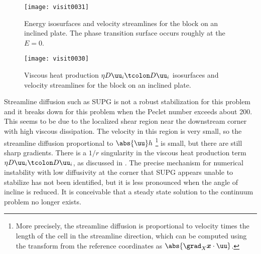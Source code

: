 \begin{figure}
  \centering\texttt{[image: visit0031]}
  \caption{Energy isosurfaces and velocity streamlines for the block on an inclined plate.
  The phase transition surface occurs roughly at the $E=0$.}\label{fig:vhtblock:energy}
\end{figure}

\begin{figure}
  \centering\texttt{[image: visit0030]}
  \caption{Viscous heat production $\eta D\uu_i\tcolon D\uu_i$ isosurfaces and velocity streamlines for the block on an inclined plate.}\label{fig:vhtblock:sigma}
\end{figure}

Streamline diffusion such as SUPG is not a robust stabilization for this problem and it breaks down for this problem when the Peclet number exceeds about 200.
This seems to be due to the localized shear region near the downstream corner with high viscous dissipation.
The velocity in this region is very small, so the streamline diffusion proportional to $\abs{\uu} h$ \footnote{%
More precisely, the streamline diffusion is proportional to velocity times the length of the cell in the streamline direction, which can be computed using the transform from the reference coordinates as $\abs{\grad_X \bm x \cdot \uu}$.
} is small, but there are still sharp gradients.
There is a $1/r$ singularity in the viscous heat production term $\eta D\uu_i\tcolon D\uu_i$, as discussed in .
The precise mechanism for numerical instability with low diffusivity at the corner that SUPG appears unable to stabilize has not been identified, but it is less pronounced when the angle of incline is reduced.
It is conceivable that a steady state solution to the continuum problem no longer exists.

